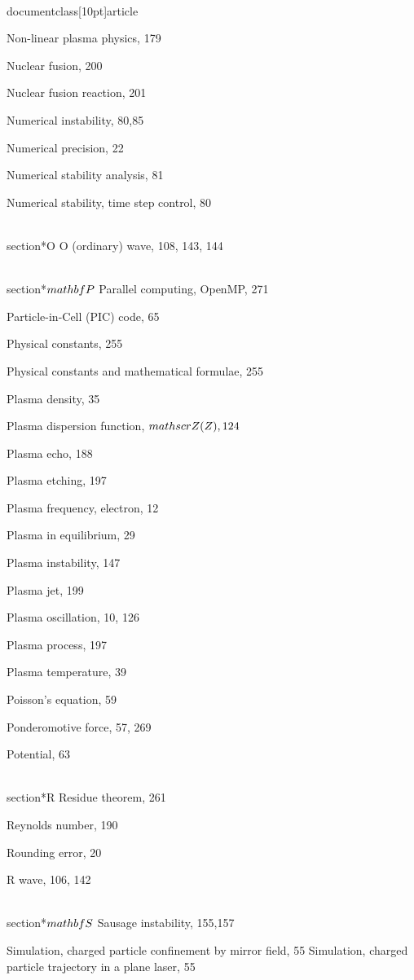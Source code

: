 \\documentclass[10pt]{article}
\begin{document}
{{{{{{Non-linear plasma physics, 179

Nuclear fusion, 200

Nuclear fusion reaction, 201

Numerical instability, 80,85

Numerical precision, 22

Numerical stability analysis, 81

Numerical stability, time step control, 80

\\section*{O}
O (ordinary) wave, 108, 143, 144

\\section*{$\\mathbf{P}$}
Parallel computing, OpenMP, 271

Particle-in-Cell (PIC) code, 65

Physical constants, 255

Physical constants and mathematical formulae, 255

Plasma density, 35

Plasma dispersion function, $\\mathscr{Z}(Z), 124$

Plasma echo, 188

Plasma etching, 197

Plasma frequency, electron, 12

Plasma in equilibrium, 29

Plasma instability, 147

Plasma jet, 199

Plasma oscillation, 10, 126

Plasma process, 197

Plasma temperature, 39

Poisson's equation, 59

Ponderomotive force, 57, 269

Potential, 63

\\section*{R}
Residue theorem, 261

Reynolds number, 190

Rounding error, 20

R wave, 106, 142

\\section*{$\\mathbf{S}$}
Sausage instability, 155,157

Simulation, charged particle confinement by mirror field, 55
Simulation, charged particle trajectory in a plane laser, 55

}}}}}}
\end{document}
